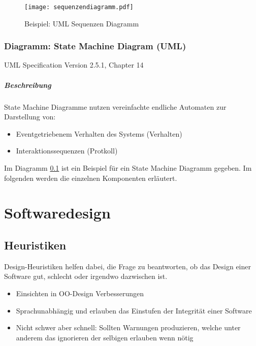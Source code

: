 				\begin{figure}[ht]
					\centering
					\texttt{[image: sequenzendiagramm.pdf]}  %
					\caption{Beispiel: UML Sequenzen Diagramm}
					\label{fig:sequence}
				\end{figure}

		\subsection{Diagramm: State Machine Diagram (UML)}
			\label{diagram:statemachine}

			{ \footnotesize UML Specification Version 2.5.1, Chapter 14}

			\paragraph{Beschreibung}
				State Machine Diagramme nutzen vereinfachte endliche Automaten zur Darstellung von:
				\begin{itemize}
					\item Eventgetriebenem Verhalten des Systems (Verhalten)
					\item Interaktionssequenzen (Protkoll)
				\end{itemize}

				Im Diagramm \ref{diagram:statemachine} ist ein Beispiel für ein State Machine Diagramm gegeben. Im folgenden werden die einzelnen Komponenten erläutert.

\chapter{Softwaredesign}
	\section{Heuristiken}
		Design-Heuristiken helfen dabei, die Frage zu beantworten, ob das Design einer Software gut, schlecht oder irgendwo dazwischen ist.
		\begin{itemize}
			\item Einsichten in OO-Design Verbesserungen
			\item Sprachunabhängig und erlauben das Einstufen der Integrität einer Software
			\item Nicht schwer aber schnell: Sollten Warnungen produzieren, welche unter anderem das ignorieren der selbigen erlauben wenn nötig
		\end{itemize}

